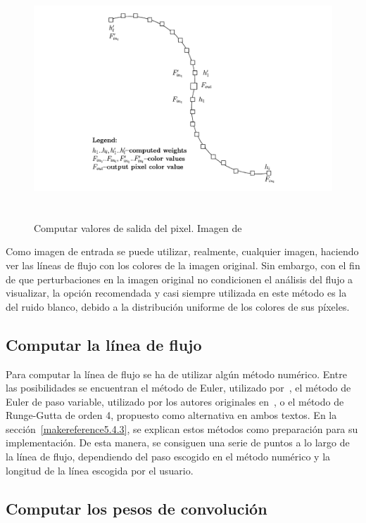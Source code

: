 \begin{figure}
		\centering
		\includegraphics[height=9cm]{figures/licoutputpixel.png}
		\caption{Computar valores de salida del pixel. Imagen de~\citet{licthesis}}	
		\label{fig:licoutputpixel}
\end{figure}

Como imagen de entrada se puede utilizar, realmente, cualquier imagen,
haciendo ver las líneas de flujo con los colores de la imagen original. Sin
embargo, con el fin de que perturbaciones en la imagen original no condicionen
el análisis del flujo a visualizar, la opción recomendada y casi siempre
utilizada en este método es la del ruido blanco, debido a la distribución
uniforme de los colores de sus píxeles. 

\subsection{Computar la línea de flujo}
\label{ref:streamline}

Para computar la línea de flujo se ha de utilizar algún método numérico. Entre
las posibilidades se encuentran el método de Euler, utilizado
por~\citet{licthesis}, el método de Euler de paso variable, utilizado por los
autores originales en~\citet{osti_10185520}, o el método de Runge-Gutta de orden
4, propuesto como alternativa en ambos textos. En la
sección~\ref{makereference5.4.3}, se explican estos métodos como preparación
para su implementación. De esta manera, se consiguen una serie de puntos a lo
largo de la línea de flujo, dependiendo del paso escogido en el método numérico
y la longitud de la línea escogida por el usuario.

\subsection{Computar los pesos de convolución}
\label{ref:convolution}

